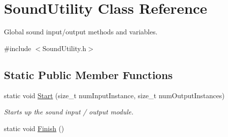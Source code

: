 \hypertarget{class_sound_utility}{
\section{SoundUtility Class Reference}
\label{class_sound_utility}
}


Global sound input/output methods and variables.  




{\ttfamily \#include $<$SoundUtility.h$>$}

\subsection*{Static Public Member Functions}
\begin{DoxyCompactItemize}
\item 
static void \hyperlink{class_sound_utility_a0d97dbcba90c9e50e4987c80d63a1c17}{Start} (size\_\-t numInputInstance, size\_\-t numOutputInstances)
\begin{DoxyCompactList}\small\item\em Starts up the sound input / output module. \item\end{DoxyCompactList}\item 
\hypertarget{class_sound_utility_a975bb68ee825fc0f23d59b76c43fafa8}{
static void \hyperlink{class_sound_utility_a975bb68ee825fc0f23d59b76c43fafa8}{Finish} ()}
\label{class_sound_utility_a975bb68ee825fc0f23d59b76c43fafa8}


\end{DoxyCompactItemize}
